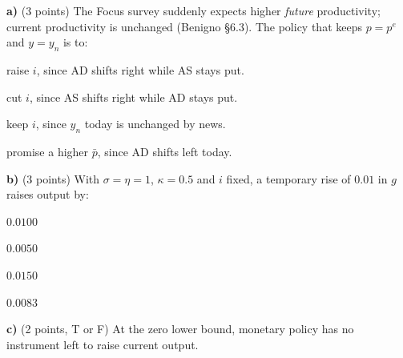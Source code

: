 \documentclass[11pt,a4paper]{article}
\begin{document}


\textbf{a)} (3 points) The Focus survey suddenly expects higher \emph{future} productivity; current
productivity is unchanged (Benigno \S6.3). The policy that keeps $p=p^e$ and $y=y_n$ is to:
\begin{alternativas}
\item raise $i$, since AD shifts right while AS stays put.
\item cut $i$, since AS shifts right while AD stays put.
\item keep $i$, since $y_n$ today is unchanged by news.
\item promise a higher $\bar p$, since AD shifts left today.
\end{alternativas}
\begin{sol}
\end{sol}

\medskip
\textbf{b)} (3 points) With $\sigma=\eta=1$, $\kappa=0.5$ and $i$ fixed, a temporary rise of $0.01$ in $g$
raises output by:
\begin{alternativas}
\item $0.0100$
\item $0.0050$
\item $0.0150$
\item $0.0083$
\end{alternativas}
\begin{sol}
\end{sol}

\medskip
\textbf{c)} (2 points, T or F) At the zero lower bound, monetary policy has no instrument left to
raise current output.
\begin{sol}
\end{sol}
\end{document}
